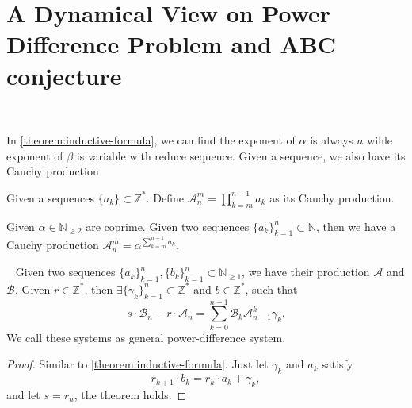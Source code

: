 \section{A Dynamical View on Power Difference Problem and ABC conjecture}~\label{sec:a-dynamical-view-on-power-difference-problem}

In \cref{theorem:inductive-formula}, we can find the exponent of $\alpha$ is always $n$ wihle exponent of $\beta$ is variable with reduce sequence. Given a sequence, we also have its Cauchy production
\begin{definition}
	Given a sequences $\{a_k\}\subset \mathbb{Z}^{*}$. Define $\mathcal{A}_{n}^{m} = \prod_{k=m}^{n-1} a_k$ as its Cauchy production.
\end{definition}
\begin{example}
	Given $\alpha \in \mathbb{N}_{\ge2}$ are coprime. Given two sequences $\{a_k\}_{k=1}^{n} \subset\mathbb{N}$, then we have a Cauchy production $\mathcal{A}_{n}^{m} = \alpha^{\sum_{k=m}^{n-1}a_k}$.
\end{example}
\begin{theorem}~\label{thm:power-diff-system-exists}
	Given two sequences $\{a_k\}_{k=1}^{n}, \{b_k\}_{k=1}^{n}\subset\mathbb{N}_{\ge1}$, we have their production $\mathcal{A}$ and $\mathcal{B}$. Given $r\in \mathbb{Z}^{*}$, then $\exists \{\gamma_k\}_{k=1}^{n}\subset\mathbb{Z}^{*}$ and $b \in\mathbb{Z}^{*}$, such that
	\[ s\cdot\mathcal{B}_n - r\cdot\mathcal{A}_n = \sum_{k=0}^{n-1}\mathcal{B}_k\mathcal{A}_{n-1}^{k}\gamma_k. \]
	We call these systems as general power-difference system.
\end{theorem}
\begin{proof}
	Similar to \cref{theorem:inductive-formula}. Just let $\gamma_k$ and $a_k$ satisfy
	\[ r_{k+1}\cdot b_{k} = r_{k}\cdot a_k + \gamma_k, \]
	and let $s = r_n$, the theorem holds.
\end{proof}

